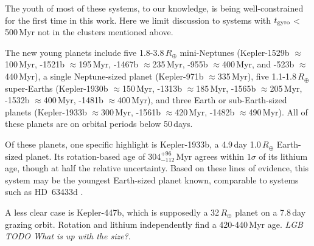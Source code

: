 \documentclass[11pt,twocolumn,tighten]{aastex63}
\begin{document}
The youth of most of these systems, to our knowledge, is being
well-constrained for the first time in this work.  Here we limit
discussion to systems with $t_{\rm gyro}$$<$500\,Myr not in the clusters
mentioned above.

The new young planets
include five 1.8-3.8\,$R_\oplus$ mini-Neptunes
(Kepler-1529b $\approx$100\,Myr,
-1521b $\approx$195\,Myr,
-1467b $\approx$235\,Myr,
-955b $\approx$400\,Myr, and
-523b $\approx$440\,Myr),
a single Neptune-sized planet
(Kepler-971b $\approx$335\,Myr),
five 1.1-1.8\,$R_\oplus$ super-Earths
(Kepler-1930b $\approx$150\,Myr,
-1313b $\approx$185\,Myr,
-1565b $\approx$205\,Myr,
-1532b $\approx$400\,Myr,
-1481b $\approx$400\,Myr),
and three Earth or sub-Earth-sized planets
(Kepler-1933b $\approx$300\,Myr,
-1561b $\approx$420\,Myr,
-1482b $\approx$490\,Myr).
All of these planets are on orbital periods below 50\,days.

Of these planets, one specific highlight is Kepler-1933b, a 4.9\,day
1.0\,$R_\oplus$ Earth-sized planet.  Its rotation-based age of
$304^{+96}_{-112}$\,Myr agrees within $1\sigma$ of its lithium age,
though at half the relative uncertainty.  Based on these lines of
evidence, this system may be the youngest Earth-sized planet known,
comparable to systems such as HD~63433d \citep[1.1\,$R_\oplus$,
$414\pm23$\,Myr][]{2024AJ....167...54C}.

A less clear case is Kepler-447b, which is supposedly a 32\,$R_\oplus$
planet on a 7.8\,day grazing orbit.  Rotation and lithium independently
find a 420-440\,Myr age.  {\it LGB TODO What is up with the size?}.
\end{document}
